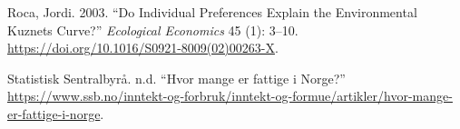 \documentclass[
  12pt,
  letterpaper,
  DIV=11,
  numbers=noendperiod]{scrartcl}
\newlength{\cslhangindent}
\newlength{\cslentryspacingunit} %
\newenvironment{CSLReferences}[2] %
 {%
  \setlength{\parindent}{0pt}
  \ifodd #1
  \let\oldpar\par
  \def\par{\hangindent=\cslhangindent\oldpar}
  \fi
  \setlength{\parskip}{#2\cslentryspacingunit}
 }%
 {}
\begin{document}
\begin{CSLReferences}{1}{0}
\leavevmode{}%
Roca, Jordi. 2003. {``Do Individual Preferences Explain the
Environmental Kuznets Curve?''} \emph{Ecological Economics} 45 (1):
3--10. \url{https://doi.org/10.1016/S0921-8009(02)00263-X}.

\leavevmode{}%
Statistisk Sentralbyrå. n.d. {``Hvor mange er fattige i Norge?''}
\url{https://www.ssb.no/inntekt-og-forbruk/inntekt-og-formue/artikler/hvor-mange-er-fattige-i-norge}.

\end{CSLReferences}



\listoffigures
\listoftables
\end{document}
